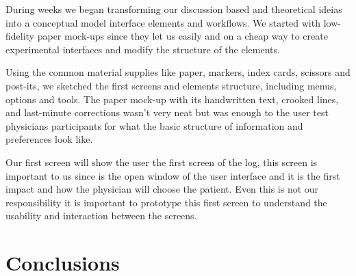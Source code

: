 During weeks we began transforming our discussion based and theoretical ideias into a conceptual model interface elements and workflows. We started with low-fidelity paper mock-ups since they let us easily and on a cheap way to create experimental interfaces and modify the structure of the elements.

Using the common material supplies like paper, markers, index cards, scissors and post-its, we sketched the first screens and elements structure, including menus, options and tools. The paper mock-up with its handwritten text, crooked lines, and last-minute corrections wasn't very neat but was enough to the user test physicians participants for what the basic structure of information and preferences look like.

Our first screen will show the user the first screen of the log, this screen is important to us since is the open window of the user interface and it is the first impact and how the physician will choose the patient. Even this is not our responsibility it is important to prototype this first screen to understand the usability and interaction between the screens.

\section{Conclusions}



\clearpage

\begin{thebibliography}{}
\bibitem{}
\end{thebibliography}





